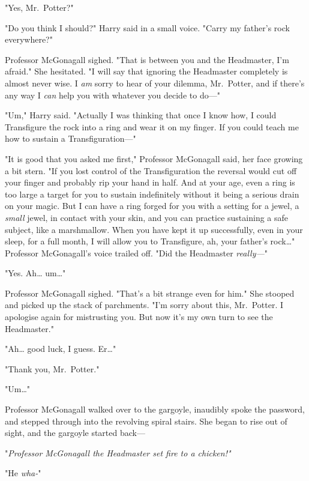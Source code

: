 "Yes, Mr.~Potter?"

"Do you think I should?" Harry said in a small voice. "Carry my father's rock 
everywhere?"

Professor McGonagall sighed. "That is between you and the Headmaster, I'm 
afraid." She hesitated. "I will say that ignoring the Headmaster completely is 
almost never wise. I \emph{am} sorry to hear of your dilemma, Mr.~Potter, and 
if there's any way I \emph{can} help you with whatever you decide to do---"

"Um," Harry said. "Actually I was thinking that once I know how, I could 
Transfigure the rock into a ring and wear it on my finger. If you could teach 
me how to sustain a Transfiguration---"

"It is good that you asked me first," Professor McGonagall said, her face 
growing a bit stern. "If you lost control of the Transfiguration the reversal 
would cut off your finger and probably rip your hand in half. And at your age, 
even a ring is too large a target for you to sustain indefinitely without it 
being a serious drain on your magic. But I can have a ring forged for you with 
a setting for a jewel, a \emph{small} jewel, in contact with your skin, and you 
can practice sustaining a safe subject, like a marshmallow. When you have kept 
it up successfully, even in your sleep, for a full month, I will allow you to 
Transfigure, ah, your father's rock{\ldots}" Professor McGonagall's voice 
trailed off. "Did the Headmaster \emph{really---}"

"Yes. Ah{\ldots} um{\ldots}"

Professor McGonagall sighed. "That's a bit strange even for him." She stooped 
and picked up the stack of parchments. "I'm sorry about this, Mr.~Potter. I 
apologise again for mistrusting you. But now it's my own turn to see the 
Headmaster."

"Ah{\ldots} good luck, I guess. Er{\ldots}"

"Thank you, Mr.~Potter."

"Um{\ldots}"

Professor McGonagall walked over to the gargoyle, inaudibly spoke the password, 
and stepped through into the revolving spiral stairs. She began to rise out of 
sight, and the gargoyle started back---

"\emph{Professor McGonagall the Headmaster set fire to a chicken!"}

"He \emph{wha-}"